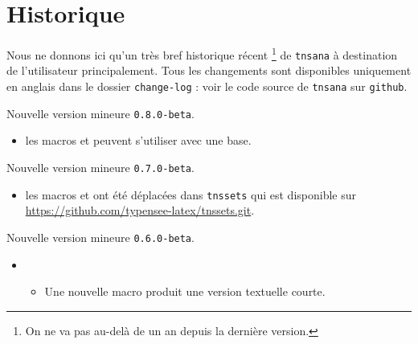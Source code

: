 \documentclass[12pt,a4paper]{article}
\begin{document}
\newpage

\section{Historique}

Nous ne donnons ici qu'un très bref historique récent
\footnote{
	On ne va pas au-delà de un an depuis la dernière version.
}
de \verb+tnsana+ à destination de l'utilisateur principalement.
Tous les changements sont disponibles uniquement en anglais dans le dossier \verb+change-log+ : voir le code source de \verb+tnsana+ sur \verb+github+.

\begin{description}

    \medskip
    \item[2020-08-23] Nouvelle version mineure \verb+0.8.0-beta+.
    
    \begin{itemize}[itemsep=.5em]
        \item {}
              les macros  et  peuvent s'utiliser avec une base.
        
    \end{itemize}
    
    \separation

    \medskip
    \item[2020-08-05] Nouvelle version mineure \verb+0.7.0-beta+.
    
    \begin{itemize}[itemsep=.5em]
        \item {}
              les macros  et  ont été déplacées dans \verb#tnssets# qui est disponible sur \url{https://github.com/typensee-latex/tnssets.git}.
        
    \end{itemize}
    
    \separation

    \medskip
    \item[2020-07-30] Nouvelle version mineure \verb+0.6.0-beta+.
    
    \begin{itemize}[itemsep=.5em]
        \item {}
        \begin{itemize}[itemsep=.5em]
            \item Une nouvelle macro  produit une version textuelle courte.
    

\end{itemize}
\end{itemize}
\end{description}
\end{document}
